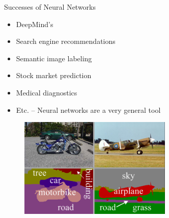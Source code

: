 \documentclass{beamer}
\newcommand{\blue}[1]{\color{blue}{#1}}
\begin{document}
	\begin{frame}{Successes of Neural Networks}
	\begin{itemize}
		\item DeepMind's \href{https://deepmind.com/research/case-studies/alphago-the-story-so-far}{\blue{AlphaGo}}
		\item Search engine recommendations
		\item Semantic image labeling
		\item Stock market prediction
		\item Medical diagnostics
		\item Etc. -- Neural networks are a very general tool
	\end{itemize}
	\begin{figure}
		\includegraphics[width=0.65\textwidth]{semantic_labels}
	\end{figure}
	\end{frame}
\end{document}
